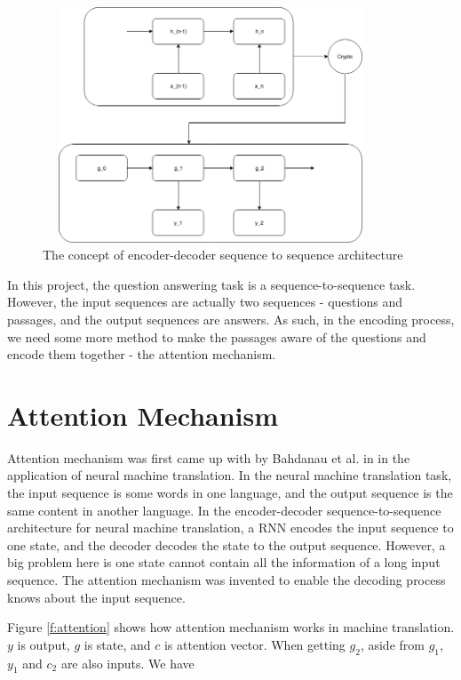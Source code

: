 \documentclass[modernstyle,12pt]{sjsuthesis}
\theoremstyle{definition}
\begin{document}
\begin{figure}[htbp]\centering
  \includegraphics[width=10cm, height=7cm]{figures/encoderDecoder.png}
  \caption{The concept of encoder-decoder sequence to sequence architecture}
  \label{f:encoderDecoder}
\end{figure}

In this project, the question answering task is a sequence-to-sequence task. However, the input sequences are actually two sequences - questions and passages, and the output sequences are answers. As such, in the encoding process, we need some more method to make the passages aware of the questions and encode them together - the attention mechanism.

\section{Attention Mechanism}\label{sect:attention}

Attention mechanism was first came up with by Bahdanau et al. in \cite{bahdanau2014neural} in the application of neural machine translation. In the neural machine translation task, the input sequence is some words in one language, and the output sequence is the same content in another language. In the encoder-decoder sequence-to-sequence architecture for neural machine translation, a RNN encodes the input sequence to one state, and the decoder decodes the state to the output sequence. However, a big problem here is one state cannot contain all the information of a long input sequence. The attention mechanism was invented to enable the decoding process knows about the input sequence.

Figure \ref{f:attention} shows how attention mechanism works in machine translation. $y$ is output, $g$ is state, and $c$ is attention vector. When getting $g_2$, aside from $g_1$, $y_1$ and $c_2$ are also inputs. We have
\end{document}
